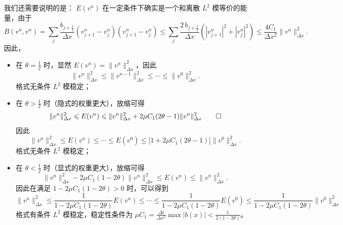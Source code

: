 \begin{solution*}
    我们还需要说明的是： $E(v^n)$ 在一定条件下确实是一个和离散 $L^2$ 模等价的能量，由于
    \[
        B(v^{n}, v^n) ={} \sum_j \frac{b_{j+\frac12}}{\Delta x}(v_{j+1}^n-v_{j}^n)(v_{j+1}^n-v_{j}^n)
        \le{} \sum_j \frac{2\,b_{j+\frac12}}{\Delta x}\left(|v_{j+1}^n|^2 + |v_{j}^n|^2\right)
        \le \frac{4 C_1}{\Delta x^2} \| v^n \|_{\Delta x}^2.
    \]
    因此，
    \begin{itemize}
        \item 在 $\theta = \frac12$ 时，显然 $E(v^n) = \|v^{n}\|_{\Delta x}^2$，因此
              \[
                  \|v^{n}\|_{\Delta x}^2 \le \|v^{n-1}\|_{\Delta x}^2 \le  \cdots \le \|v^{0}\|_{\Delta x}^2.
              \]
              格式无条件 $L^2$ 模稳定；

        \item 在 $\theta > \frac12$ 时（隐式的权重更大），放缩可得
              \[
                  \|v^{n}\|_{\Delta x}^2  \le E(v^n) \le  \|v^{n}\|_{\Delta x}^2  +  2 \mu C_1(2\theta-1) \|v^{n}\|_{\Delta x}^2 \qedhere
              \]
              因此
              \[
                  \|v^{n}\|_{\Delta x}^2 \le E(v^n) \le \cdots \le E(v^0)
                  \le \Big[ 1 +  2 \mu C_1(2\theta-1)\Big] \|v^{0}\|_{\Delta x}^2.
              \]
              格式无条件 $L^2$ 模稳定；

        \item 在 $\theta < \frac12$ 时（显式的权重更大），放缩可得
              \[
                  \|v^{n}\|_{\Delta x}^2  -  2 \mu C_1(1-2\theta) \|v^{n}\|_{\Delta x}^2 \le E(v^n) \le   \| v^n \|_{\Delta x}^2.
              \]
              因此在满足 $1 - 2 \mu C_1(1-2\theta) > 0$ 时，可以得到
              {\small\[
                  \|v^{n}\|_{\Delta x}^2 \le \frac{1}{1 - 2 \mu C_1(1-2\theta)} E(v^n)
                  \le \cdots
                  \le \frac{1}{1 - 2 \mu C_1(1-2\theta)} E(v^0)
                  \le \frac{1}{1 - 2 \mu C_1(1-2\theta)} \|v^{0}\|_{\Delta x}^2
              \]}
              格式有条件 $L^2$ 模稳定，稳定性条件为 $\mu C_1 = \frac{\Delta t}{\Delta x^2} \max|b(x)| < \frac{1}{2(1-2\theta)}$。
    \end{itemize}
\end{solution*}

